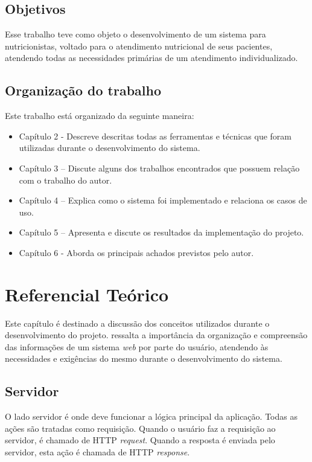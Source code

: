 \documentclass[
	12pt,				%
    oneside,			%
	a4paper,			%
	english,			%
	french,				%
	spanish,			%
	brazil,				%
	]{abntex2}
\begin{document}
\section{Objetivos}

Esse trabalho teve como objeto o desenvolvimento de um sistema para
nutricionistas, voltado para o atendimento nutricional de seus pacientes, atendendo
todas as necessidades primárias de um atendimento individualizado.

\section{Organização do trabalho}
Este trabalho está organizado da seguinte maneira:

 \begin{itemize}

	\item Capítulo 2 - Descreve descritas todas as ferramentas e técnicas que foram utilizadas durante o desenvolvimento do sistema.
	\item Capítulo 3 – Discute alguns dos trabalhos encontrados que possuem relação com o trabalho do autor.
	\item Capítulo 4 – Explica como o sistema foi implementado e relaciona os casos de uso.
	\item Capítulo 5 – Apresenta e discute os resultados da implementação do projeto.
	\item Capítulo 6 - Aborda os principais achados previstos pelo autor.

\end{itemize}

\chapter{Referencial Teórico}

Este capítulo é destinado a discussão dos conceitos utilizados durante o desenvolvimento do projeto.  ressalta a importância da organização e compreensão das informações de um sistema \textit{web} por parte do usuário, atendendo às necessidades e exigências do mesmo durante o desenvolvimento do sistema.

\section{Servidor}

O lado servidor é onde deve funcionar a lógica principal da aplicação. Todas as
ações são tratadas como requisição. Quando o usuário faz a requisição ao servidor,
é chamado de HTTP \textit{request}. Quando a resposta é enviada pelo servidor, esta ação
é chamada de HTTP \textit{response}.
\end{document}
